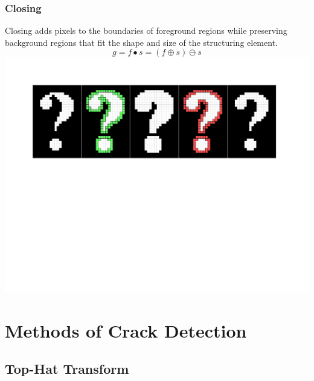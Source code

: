 \documentclass{beamer}
\begin{document}
\begin{frame}
\frametitle{Closing}
\begin{center}
Closing adds pixels to the boundaries of foreground regions while preserving background regions that fit the shape and size of the structuring element.
\begin{equation*}
g = f \bullet s = (f \oplus s) \ominus s
\end{equation*}
\includegraphics[width=1\textwidth,trim={0 0 0 0.5in},clip]{closing}
\end{center}
\end{frame}

\section[Methods of Crack Detection]{Methods of Crack Detection}

\subsection[Top-Hat Transform]{Top-Hat Transform}
\end{document}
